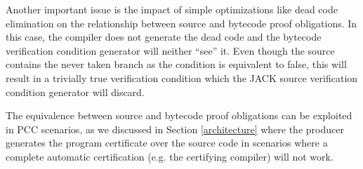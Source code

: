  Another important issue is the impact of simple optimizations like dead code elimination on the relationship between source and bytecode proof obligations. 
In this case, the compiler does not generate the dead code and the bytecode verification condition generator will neither ``see'' it. 
Even though the source contains the never taken branch as the condition is equivalent to false, this will result in a trivially true
verification condition which the JACK source verification condition generator will discard.

The equivalence between source and bytecode proof obligations can be exploited in PCC scenarios, as we discussed in Section \ref{architecture} where 
the producer generates the program certificate over the source code in scenarios where a complete automatic certification (e.g. the certifying compiler) will not work.







%
%
%
%
%
%
%
%
%

